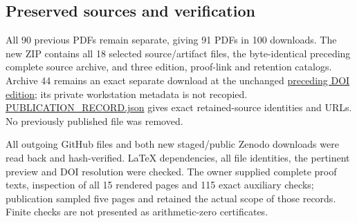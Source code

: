 \documentclass[
]{article}
\begin{document}
\subsection{Preserved sources and
verification}\label{preserved-sources-and-verification}

All 90 previous PDFs remain separate, giving 91 PDFs in 100 downloads.
The new ZIP contains all 18 selected source/artifact files, the
byte-identical preceding complete source archive, and three edition,
proof-link and retention catalogs. Archive 44 remains an exact separate
download at the unchanged
\href{https://zenodo.org/records/22908504}{preceding DOI edition}; its
private workstation metadata is not recopied.
\url{PUBLICATION_RECORD.json} gives exact retained-source identities and
URLs. No previously published file was removed.

All outgoing GitHub files and both new staged/public Zenodo downloads
were read back and hash-verified. LaTeX dependencies, all file
identities, the pertinent preview and DOI resolution were checked. The
owner supplied complete proof texts, inspection of all 15 rendered pages
and 115 exact auxiliary checks; publication sampled five pages and
retained the actual scope of those records. Finite checks are not
presented as arithmetic-zero certificates.
\end{document}
